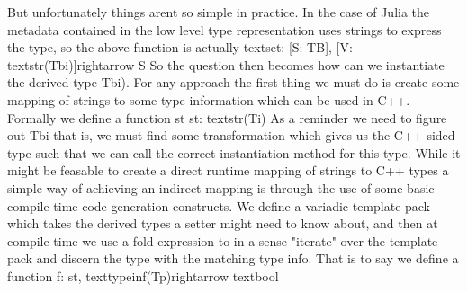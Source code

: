 {}But unfortunately things arent so simple in practice. In the case of Julia the metadata contained in the low level type representation uses strings to express the type, so the above function is actually \markdownRendererDollarSign{}\markdownRendererDollarSign{} \markdownRendererBackslash{}text\markdownRendererLeftBrace{}set\markdownRendererRightBrace{}: [S: T\markdownRendererUnderscore{}B], [V: \markdownRendererBackslash{}text\markdownRendererLeftBrace{}str\markdownRendererRightBrace{}(T\markdownRendererUnderscore{}\markdownRendererLeftBrace{}bi\markdownRendererRightBrace{})]\markdownRendererBackslash{}rightarrow S \markdownRendererDollarSign{}\markdownRendererDollarSign{} So the question then becomes how can we instantiate the derived type \markdownRendererDollarSign{}T\markdownRendererLeftBrace{}bi\markdownRendererRightBrace{})\markdownRendererDollarSign{}. For any approach the first thing we must do is create some mapping of strings to some type information which can be used in C++. Formally we define a function \markdownRendererDollarSign{}st\markdownRendererDollarSign{} \markdownRendererDollarSign{}\markdownRendererDollarSign{} st: \markdownRendererBackslash{}text\markdownRendererLeftBrace{}str\markdownRendererRightBrace{}(Ti) \markdownRendererDollarSign{}\markdownRendererDollarSign{}\markdownRendererInterblockSeparator
{}As a reminder we need to figure out \markdownRendererDollarSign{}T\markdownRendererUnderscore{}\markdownRendererLeftBrace{}bi\markdownRendererRightBrace{}\markdownRendererDollarSign{} that is, we must find some transformation which gives us the C++ sided type such that we can call the correct instantiation method for this type. \markdownRendererInterblockSeparator
{}While it might be feasable to create a direct runtime mapping of strings to C++ types a simple way of achieving an indirect mapping is through the use of some basic compile time code generation constructs. We define a variadic template pack which takes the derived types a setter might need to know about, and then at compile time we use a fold expression to in a sense "iterate" over the template pack and discern the type with the matching type info. That is to say we define a function \markdownRendererDollarSign{}\markdownRendererDollarSign{} f: st, \markdownRendererBackslash{}text\markdownRendererLeftBrace{}typeinf\markdownRendererRightBrace{}(T\markdownRendererUnderscore{}p)\markdownRendererBackslash{}rightarrow \markdownRendererBackslash{}text\markdownRendererLeftBrace{}bool\markdownRendererRightBrace{} \markdownRendererDollarSign{}\markdownRendererDollarSign{}\markdownRendererInterblockSeparator
